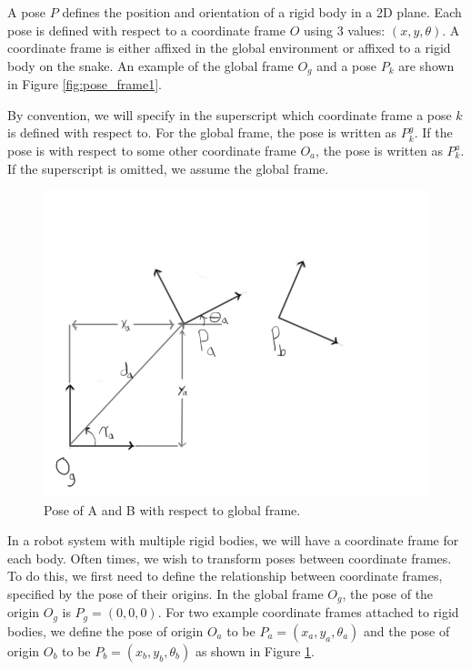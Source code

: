 A pose $P$ defines the position and orientation of a rigid body in a 2D plane.  Each pose is defined with respect to a coordinate frame $O$ using 3 values: $(x,y,\theta)$.  A coordinate frame is either affixed in the global environment or affixed to a rigid body on the snake.  An example of the global frame $O_g$ and a pose $P_k$ are shown in Figure \ref{fig:pose_frame1}.

By convention, we will specify in the superscript which coordinate frame a pose $k$ is defined with respect to.  For the global frame, the pose is written as $P_k^g$.  If the pose is with respect to some other coordinate frame $O_a$, the pose is written as $P_k^a$.  If the superscript is omitted, we assume the global frame.

\begin{figure}
\begin{center}
\includegraphics[scale=0.5]{3_pose_frame2.png}
\end{center}
\caption{Pose of A and B with respect to global frame.}
\label{fig:pose_frame2}
\end{figure}

In a robot system with multiple rigid bodies, we will have a coordinate frame for each body.  Often times, we wish to transform poses between coordinate frames.  To do this, we first need to define the relationship between coordinate frames, specified by the pose of their origins.  In the global frame $O_g$, the pose of the origin $O_g$ is $P_g = (0,0,0)$.  For two example coordinate frames attached to rigid bodies, we define the pose of origin $O_a$ to be $P_a = (x_a, y_a, \theta_a)$ and the pose of origin $O_b$ to be $P_b = (x_b, y_b, \theta_b)$ as shown in Figure \ref{fig:pose_frame2}.

